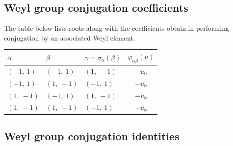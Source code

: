 \documentclass[11pt]{article}
\newcommand{\noi}{\noindent}
\theoremstyle{definition}
\begin{document}
\subsection{Weyl group conjugation coefficients}

The table below lists roots along with the coefficients obtain in performing conjugation by an associated Weyl element.

\bigskip

\noi \noindent \begin{longtable}{|l|l|l|c|}
    \hline
    \textbf{$\alpha$} & \textbf{$\beta$} & \textbf{$\gamma = \sigma_{\alpha}(\beta)$} & $\varphi_{\alpha\beta}(u)$ \\
    \hline
    \endhead
    $\left( -1, \  1\right)$ & $\left( -1, \  1\right)$ & $\left( 1, \  -1\right)$ & $- u_{0}$ \\
    \hline
    $\left( -1, \  1\right)$ & $\left( 1, \  -1\right)$ & $\left( -1, \  1\right)$ & $- u_{0}$ \\
    \hline
    $\left( 1, \  -1\right)$ & $\left( -1, \  1\right)$ & $\left( 1, \  -1\right)$ & $- u_{0}$ \\
    \hline
    $\left( 1, \  -1\right)$ & $\left( 1, \  -1\right)$ & $\left( -1, \  1\right)$ & $- u_{0}$ \\
    \hline
\end{longtable}


\subsection{Weyl group conjugation identities}
\end{document}
